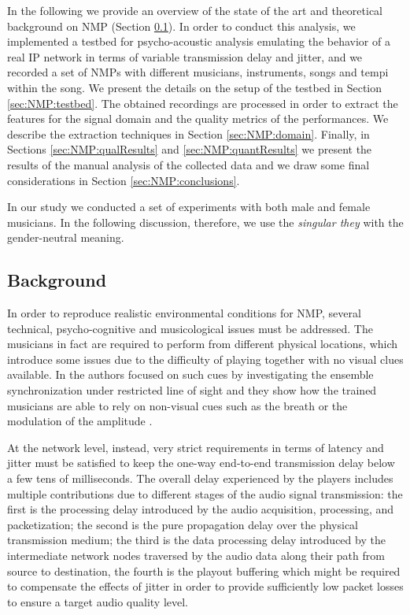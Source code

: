 In the following we provide an overview of the state of the art and theoretical background on NMP (Section \ref{sec:NMP:background}). In order to conduct this analysis, we implemented a testbed for psycho-acoustic analysis emulating the behavior of a real IP network in terms of variable transmission delay and jitter, and we recorded a set of NMPs with different musicians, instruments, songs and tempi within the song. We present the details on the setup of the testbed in Section \ref{sec:NMP:testbed}. The obtained recordings are processed in order to extract the features for the signal domain and the quality metrics of the performances. We describe the extraction techniques in Section 
\ref{sec:NMP:domain}. Finally, in Sections \ref{sec:NMP:qualResults} and \ref{sec:NMP:quantResults} we present the results of the manual analysis of the collected data and we draw some final considerations in Section \ref{sec:NMP:conclusions}.

In our study we conducted a set of experiments with both male and female musicians. In the following discussion, therefore, we use the \textit{singular they} with the gender-neutral meaning. 



\subsection{Background}\label{sec:NMP:background}
In order to reproduce realistic environmental conditions for NMP, several technical, psycho-cognitive and musicological issues must be addressed. The musicians in fact are required to perform from different physical locations, which introduce some issues due to the difficulty of playing together with no visual clues available. In \cite{Vera2013,Vera2013b} the authors focused on such cues by investigating the ensemble synchronization under restricted line of sight and they show how the trained musicians are able to rely on non-visual cues such as the breath \cite{Vera2013} or the modulation of the amplitude \cite{Vera2013b}.

At the network level, instead, very strict requirements in terms of latency and jitter must be satisfied to keep the one-way end-to-end transmission delay below a few tens of milliseconds. The overall delay experienced by the players includes multiple contributions due to different stages of the audio signal transmission: the first is the processing delay introduced by the audio acquisition, processing, and packetization; the second is the pure propagation delay over the physical transmission medium; the third is the data processing delay introduced by the intermediate network nodes traversed by the audio data along their path from source to destination, the fourth is the playout buffering which might be required to compensate the effects of jitter in order to provide sufficiently low packet losses to ensure a target audio quality level.

